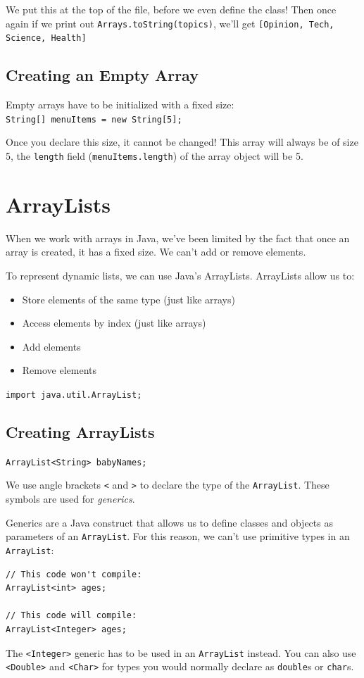 \documentclass[a4paper, 12pt]{article}
\begin{document}
We put this at the top of the file, before we even define the class! Then once again if we print out \verb|Arrays.toString(topics)|, we'll get \verb|[Opinion, Tech, Science, Health]|

\subsection{Creating an Empty Array}
Empty arrays have to be initialized with a fixed size:\\
\verb|String[] menuItems = new String[5];|

Once you declare this size, it cannot be changed! This array will always be of size 5, the \verb|length| field (\verb|menuItems.length|) of the array object will be 5.


\section{ArrayLists}
When we work with arrays in Java, we've been limited by the fact that once an array is created, it has a fixed size. We can't add or remove elements.

To represent dynamic lists, we can use Java's ArrayLists. ArrayLists allow us to:
\begin{itemize}
\item Store elements of the same type (just like arrays)

\item Access elements by index (just like arrays)

\item Add elements

\item Remove elements

\end{itemize}

\verb|import java.util.ArrayList;|

\subsection{Creating ArrayLists}
\verb|ArrayList<String> babyNames;|

We use angle brackets \verb|<| and \verb|>| to declare the type of the \verb|ArrayList|. These symbols are used for \textit{generics}.

Generics are a Java construct that allows us to define classes and objects as parameters of an \verb|ArrayList|. For this reason, we can't use primitive types in an \verb|ArrayList|:
\begin{verbatim}
// This code won't compile:
ArrayList<int> ages;

// This code will compile:
ArrayList<Integer> ages;
\end{verbatim}
The \verb|<Integer>| generic has to be used in an \verb|ArrayList| instead. You can also use \verb|<Double>| and \verb|<Char>| for types you would normally declare as \verb|double|s or \verb|char|s.
\end{document}
